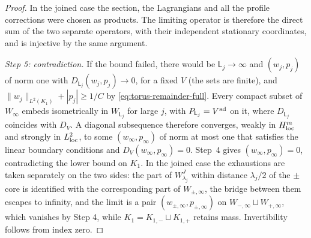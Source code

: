 \documentclass[11pt]{amsart}
\theoremstyle{definition}
\theoremstyle{remark}
\theoremstyle{plain}
\numberwithin{equation}{section}
\begin{document}
\begin{proof}
In the joined case the section, the Lagrangians and all the
profile corrections were chosen as products. The limiting
operator is therefore the direct sum of the two separate
operators, with their independent stationary coordinates, and
is injective by the same argument.

\emph{Step 5: contradiction.} If the bound failed, there would be $\mathsf L_j\to\infty$ and
$(w_j,p_j)$ of norm one with $D_{\mathsf L_j}(w_j,p_j)\to0$, for a fixed $V$ (the sets are finite),
and $\|w_j\|_{L^2(K_1)}+|p_j|\ge1/C$ by \eqref{eq:torus-remainder-full}. Every compact subset of
$W_\infty$ embeds isometrically in $W_{\mathsf L_j}$ for large $j$, with $P_{\mathsf L_j}=V^{\rm ad}$
on it, where $D_{\mathsf L_j}$ coincides with $D_V$. A diagonal subsequence therefore converges,
weakly in $H^m_{\rm loc}$ and strongly in $L^2_{\rm loc}$, to some $(w_\infty,p_\infty)$ of norm at
most one that satisfies the linear boundary conditions and $D_V(w_\infty,p_\infty)=0$. Step~4
gives $(w_\infty,p_\infty)=0$, contradicting the lower bound on $K_1$. In the joined case the exhaustions are taken separately on
the two sides: the part of $W^J_{\lambda_j}$ within distance $\lambda_j/2$ of the $\pm$ core is
identified with the corresponding part of $W_{\pm,\infty}$, the bridge between them
escapes to infinity, and the limit is a pair $(w_{\pm,\infty},p_{\pm,\infty})$ on
$W_{-,\infty}\sqcup W_{+,\infty}$, which vanishes by Step 4, while $K_1=K_{1,-}\sqcup K_{1,+}$ retains
mass. Invertibility follows from index zero.
\end{proof}
\end{document}
